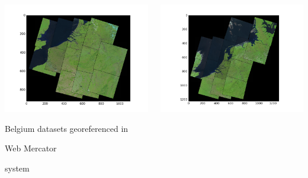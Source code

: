 \documentclass[c]{beamer}
\begin{document}
\begin{frame}
\begin{itemize}
{\begin{columns}
\begin{column}{0.33\textwidth}
\begin{overlayarea}{\linewidth}{3cm}
    \includegraphics[scale=0.20]{images/Belgium/covering-selection.png}
  \end{overlayarea}
  \begin{overlayarea}{\linewidth}{1cm}
    \centering
    \tiny Belgium datasets georeferenced in \begin{itshape}Web Mercator\end{itshape} system\par
  \end{overlayarea}
  \end{column}
  \begin{column}{0.33\textwidth}
  \begin{overlayarea}{\linewidth}{3cm}
    \centering\vfill
    \includegraphics[scale=0.20]{images/Netherlands/covering-selection.png}

\end{overlayarea}
\end{column}
\end{columns}}
\end{itemize}
\end{frame}
\end{document}
